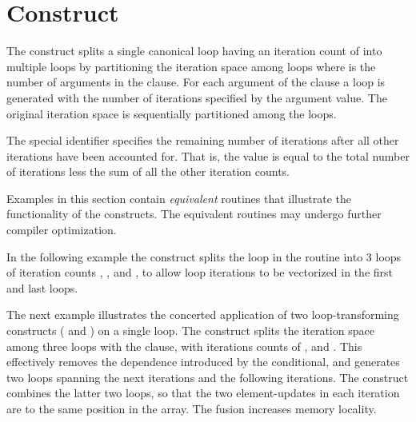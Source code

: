 \section{ Construct}
\label{sec:split}



The  construct splits a single canonical loop having an iteration
count of  into
multiple loops by partitioning the iteration space among  loops
where  is the number of arguments in the  clause.
For each argument of the  clause a loop is 
generated with the number of iterations specified by the argument value.
The original iteration space is sequentially partitioned among the loops.

The special  identifier specifies
the remaining number of iterations after all other iterations have been accounted for.
That is, the  value is equal to the total number of iterations less the
sum of all the other iteration counts.

Examples in this section contain \emph{equivalent}
routines that illustrate the functionality of the constructs. 
The equivalent routines may undergo further compiler optimization.

In the following example the  construct splits the loop
in the  routine
into 3 loops of iteration counts , , and
, to allow loop iterations to be vectorized in the first and last loops.

\clearpage

The next example illustrates the concerted application
of two loop-transforming constructs ( and )
on a single loop. The  construct splits the iteration
space among three loops with the  clause,
with iterations counts of ,  and . This effectively removes the
dependence introduced by the  conditional, and generates
two loops spanning the next  iterations and the following  iterations.
The  construct combines the latter two
loops, so that the two element-updates in each iteration are to the same
position in the array. The fusion increases memory locality.

